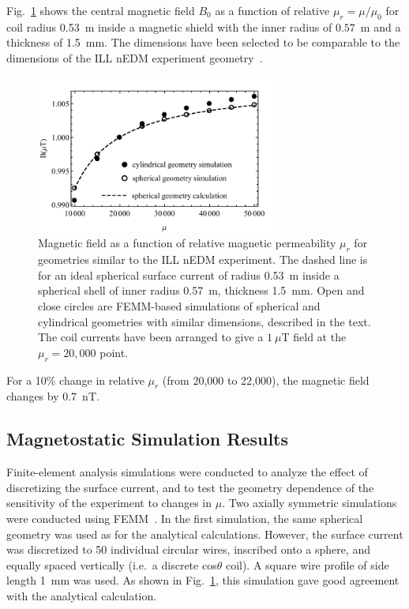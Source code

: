 Fig.~\ref{fig:Magnetic_Field} shows the central magnetic field $B_0$
as a function of relative $\mu_r=\mu/\mu_0$ for coil radius 0.53~m
inside a magnetic shield with the inner radius of $0.57$~m and a
thickness of 1.5~mm.  The dimensions have been selected to be
comparable to the dimensions of the ILL nEDM experiment
geometry~\cite{bib:baker,bib:knecht}.
\begin{figure}[h!]
\begin{center}
   \includegraphics[width=0.7\textwidth]{femm_and_calcs.pdf}
    \caption{Magnetic field as a function of relative magnetic
      permeability $\mu_r$ for geometries similar to the ILL nEDM
      experiment.  The dashed line is for an ideal spherical surface
      current of radius 0.53~m inside a spherical shell of inner
      radius 0.57~m, thickness 1.5~mm.  Open and close circles are
      FEMM-based simulations of spherical and cylindrical geometries
      with similar dimensions, described in the text.  The coil
      currents have been arranged to give a $1~\mu$T field at the
      $\mu_r=20,000$ point.}
    \label{fig:Magnetic_Field}
    \end{center}
\end{figure} 
For a 10\% change in relative $\mu_r$ (from 20,000 to 22,000), the
magnetic field changes by 0.7~nT.



\subsection{Magnetostatic Simulation Results \label{sec:femm}}

Finite-element analysis simulations were conducted to analyze the
effect of discretizing the surface current, and to test the geometry
dependence of the sensitivity of the experiment to changes in $\mu$.
Two axially symmetric simulations were conducted using
FEMM~\cite{bib:femm}.  In the first simulation, the same spherical
geometry was used as for the analytical calculations.  However, the
surface current was discretized to 50 individual circular wires,
inscribed onto a sphere, and equally spaced vertically (i.e.~a
discrete cos$\theta$ coil).  A square wire profile of side length 1~mm
was used.  As shown in Fig.~\ref{fig:Magnetic_Field}, this simulation
gave good agreement with the analytical calculation.

